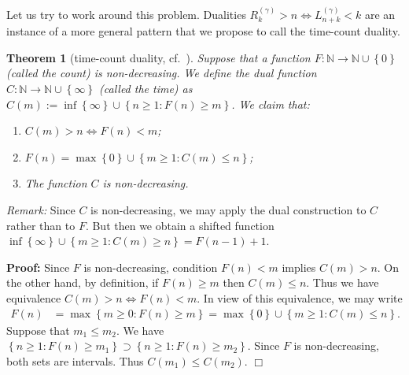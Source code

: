 \documentclass[a4paper,12pt]{article}
\newcommand{\klam}[1]{\left\{ #1 \right\}}
\newtheorem{theorem}{Theorem}
\newenvironment*{proof}{\begin{trivlist}\item[]
\noindent\textbf{Proof:}}{$\Box$\par\end{trivlist}}
\begin{document}
Let us try to work around this problem.  Dualities
$R^{(\gamma)}_k>n\iff L^{(\gamma)}_{n+k}<k$ are an instance of a more
general pattern that we propose to call the time-count duality.
\begin{theorem}[time-count duality, cf.\ \cite{WynerZiv89}]
  \label{theoTimeCount}
  Suppose that a function
  $F:\mathbb{N}\rightarrow\mathbb{N}\cup\klam{0}$ (called the count)
  is non-decreasing. We define the dual function
  $C:\mathbb{N}\rightarrow\mathbb{N}\cup\klam{\infty}$ (called the
  time) as
    $C(m):=\inf\klam{\infty}\cup\klam{n\ge 1: F(n)\ge m}$.
  We claim that:
  \begin{enumerate}
  \item $C(m)>n\iff F(n)<m$;    
  \item $F(n)=\max\klam{0}\cup\klam{m\ge 1: C(m)\le n}$;    
  \item The function $C$ is non-decreasing.
  \end{enumerate}
\end{theorem}
\noindent
\emph{Remark:} Since $C$ is non-decreasing, we may apply the dual
construction to $C$ rather than to $F$. But then we obtain a shifted
function $\inf\klam{\infty}\cup\klam{m\ge 1: C(m)\ge n}=F(n-1)+1$.
\begin{proof}
  Since $F$ is non-decreasing, condition $F(n)<m$ implies $C(m)>n$.
  On the other hand, by definition, if $F(n)\ge m$ then $C(m)\le n$.
  Thus we have equivalence $C(m)>n\iff F(n)<m$.  In view of this
  equivalence, we may write
  \begin{align}
    F(n)&=\max\klam{m\ge 0: F(n)\ge m}
    =\max\klam{0}\cup\klam{m\ge 1: C(m)\le n}
    .
  \end{align}
  Suppose that $m_1\le m_2$. We have
  $\klam{n\ge 1: F(n)\ge m_1}\supset \klam{n\ge 1: F(n)\ge m_2}$.
  Since $F$ is non-decreasing, both sets are intervals. Thus
  $C(m_1)\le C(m_2)$.
\end{proof}
\end{document}
